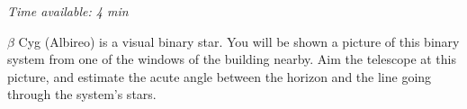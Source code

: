 \emph{Time available: 4 min}

$\beta$ Cyg (Albireo) is a visual binary star. You will be shown a picture
of this binary system from one of the windows of the building nearby. Aim
the telescope at this picture, and estimate the acute angle between the
horizon and the line going through the system's stars.
